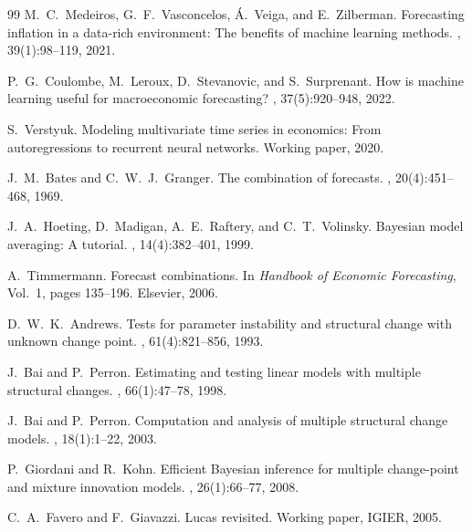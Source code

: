 \documentclass[12pt,a4paper]{article}
\begin{document}
\begin{thebibliography}{99}
M.~C.~Medeiros, G.~F.~Vasconcelos, \'{A}.~Veiga, and E.~Zilberman.
\newblock Forecasting inflation in a data-rich environment: The benefits of
machine learning methods.
, 39(1):98--119,
2021.

P.~G.~Coulombe, M.~Leroux, D.~Stevanovic, and S.~Surprenant.
\newblock How is machine learning useful for macroeconomic forecasting?
, 37(5):920--948, 2022.

S.~Verstyuk.
\newblock Modeling multivariate time series in economics: From autoregressions
to recurrent neural networks.
\newblock Working paper, 2020.

J.~M.~Bates and C.~W.~J.~Granger.
\newblock The combination of forecasts.
, 20(4):451--468, 1969.

J.~A.~Hoeting, D.~Madigan, A.~E.~Raftery, and C.~T.~Volinsky.
\newblock Bayesian model averaging: A tutorial.
, 14(4):382--401, 1999.

A.~Timmermann.
\newblock Forecast combinations.
\newblock In {\em Handbook of Economic Forecasting}, Vol.\ 1, pages 135--196.
Elsevier, 2006.

D.~W.~K.~Andrews.
\newblock Tests for parameter instability and structural change with unknown
change point.
, 61(4):821--856, 1993.

J.~Bai and P.~Perron.
\newblock Estimating and testing linear models with multiple structural
changes.
, 66(1):47--78, 1998.

J.~Bai and P.~Perron.
\newblock Computation and analysis of multiple structural change models.
, 18(1):1--22, 2003.

P.~Giordani and R.~Kohn.
\newblock Efficient Bayesian inference for multiple change-point and mixture
innovation models.
, 26(1):66--77,
2008.

C.~A.~Favero and F.~Giavazzi.
\newblock Lucas revisited.
\newblock Working paper, IGIER, 2005.


\end{thebibliography}
\end{document}
